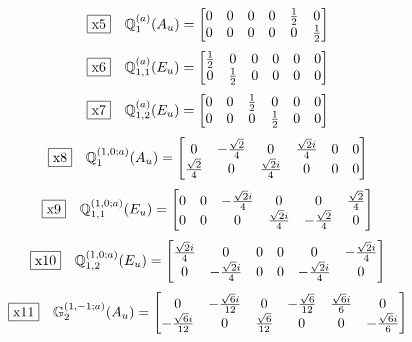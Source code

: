 \documentclass[fleqn,10pt,landscape]{jsarticle}
\begin{document}
\begin{dmath*}
\fbox{x5}\quad \mathbb{Q}_{1}^{(a)}(A_{u})=\begin{bmatrix} 0 & 0 & 0 & 0 & \frac{1}{2} & 0 \\ 0 & 0 & 0 & 0 & 0 & \frac{1}{2} \end{bmatrix}
\end{dmath*}
\begin{dmath*}
\fbox{x6}\quad \mathbb{Q}_{1,1}^{(a)}(E_{u})=\begin{bmatrix} \frac{1}{2} & 0 & 0 & 0 & 0 & 0 \\ 0 & \frac{1}{2} & 0 & 0 & 0 & 0 \end{bmatrix}
\end{dmath*}
\begin{dmath*}
\fbox{x7}\quad \mathbb{Q}_{1,2}^{(a)}(E_{u})=\begin{bmatrix} 0 & 0 & \frac{1}{2} & 0 & 0 & 0 \\ 0 & 0 & 0 & \frac{1}{2} & 0 & 0 \end{bmatrix}
\end{dmath*}
\begin{dmath*}
\fbox{x8}\quad \mathbb{Q}_{1}^{(1,0;a)}(A_{u})=\begin{bmatrix} 0 & - \frac{\sqrt{2}}{4} & 0 & \frac{\sqrt{2} i}{4} & 0 & 0 \\ \frac{\sqrt{2}}{4} & 0 & \frac{\sqrt{2} i}{4} & 0 & 0 & 0 \end{bmatrix}
\end{dmath*}
\begin{dmath*}
\fbox{x9}\quad \mathbb{Q}_{1,1}^{(1,0;a)}(E_{u})=\begin{bmatrix} 0 & 0 & - \frac{\sqrt{2} i}{4} & 0 & 0 & \frac{\sqrt{2}}{4} \\ 0 & 0 & 0 & \frac{\sqrt{2} i}{4} & - \frac{\sqrt{2}}{4} & 0 \end{bmatrix}
\end{dmath*}
\begin{dmath*}
\fbox{x10}\quad \mathbb{Q}_{1,2}^{(1,0;a)}(E_{u})=\begin{bmatrix} \frac{\sqrt{2} i}{4} & 0 & 0 & 0 & 0 & - \frac{\sqrt{2} i}{4} \\ 0 & - \frac{\sqrt{2} i}{4} & 0 & 0 & - \frac{\sqrt{2} i}{4} & 0 \end{bmatrix}
\end{dmath*}
\begin{dmath*}
\fbox{x11}\quad \mathbb{G}_{2}^{(1,-1;a)}(A_{u})=\begin{bmatrix} 0 & - \frac{\sqrt{6} i}{12} & 0 & - \frac{\sqrt{6}}{12} & \frac{\sqrt{6} i}{6} & 0 \\ - \frac{\sqrt{6} i}{12} & 0 & \frac{\sqrt{6}}{12} & 0 & 0 & - \frac{\sqrt{6} i}{6} \end{bmatrix}
\end{dmath*}
\end{document}
